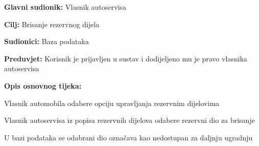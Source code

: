 				
					\noindent {}
					\begin{packed_item}
						
						\item \textbf{Glavni sudionik: } Vlasnik autoservisa
						\item  \textbf{Cilj:} Brisanje rezervnog dijela
						\item  \textbf{Sudionici:} Baza podataka
						\item  \textbf{Preduvjet:} Korisnik je prijavljen u sustav i dodijeljeno mu je pravo vlasnika autoservisa
						\item  \textbf{Opis osnovnog tijeka:}
						
						\item[] \begin{packed_enum}
							
							\item Vlasnik automobila odabere opciju upravljanja rezervnim dijelovima
							\item Vlasnik autoservisa iz popisa rezervnih dijelova odabere rezervni dio za brisanje
							\item U bazi podataka se odabrani dio označava kao nedostupan za daljnju ugradnju
							
						\end{packed_enum}
					\end{packed_item}
					
